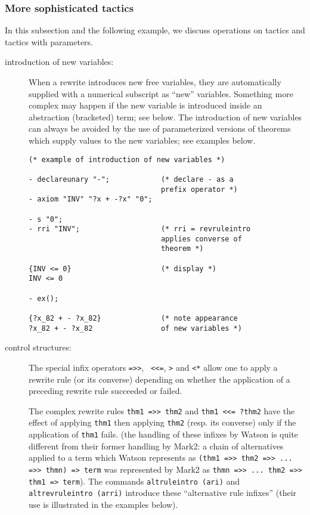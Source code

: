 \documentclass{kluwer}
\begin{document}
\begin{article}
\subsubsection{More sophisticated tactics}

In this subsection and the following example, we discuss operations
on tactics and tactics with parameters.

\begin{description}

\item[introduction of new variables:] When a rewrite introduces new
free variables, they are automatically supplied with a numerical
subscript as ``new'' variables.  Something more complex may happen if
the new variable is introduced inside an abstraction (bracketed) term;
see below.  The introduction of new variables can always be avoided by
the use of parameterized versions of theorems which supply values to
the new variables; see examples below.

\newpage

\begin{verbatim}
(* example of introduction of new variables *)

- declareunary "-";            (* declare - as a
                               prefix operator *)
- axiom "INV" "?x + -?x" "0";

- s "0";
- rri "INV";                   (* rri = revruleintro 
                               applies converse of 
                               theorem *)

{INV <= 0}                     (* display *)
INV <= 0

- ex();

{?x_82 + - ?x_82}              (* note appearance 
?x_82 + - ?x_82                of new variables *)
\end{verbatim}


\item[control structures:] The special infix operators {\tt =>>}, {\tt
<<=}, {\tt *>} and {\tt <*} allow one to apply a rewrite rule (or its
converse) depending on whether the application of a preceding rewrite
rule succeeded or failed.  

The complex rewrite rules {\tt thm1 =>> thm2} and {\tt thm1 <<= ?thm2}
have the effect of applying {\tt thm1} then applying {\tt thm2}
(resp. its converse) only if the application of {\tt thm1} fails.
(the handling of these infixes by Watson is quite different from their
former handling by Mark2: a chain of alternatives applied to a term
which Watson represents as {\tt (thm1 =>> thm2 =>> ... =>> thmn) =>
term} was represented by Mark2 as {\tt thmn =>> ... thm2 =>> thm1 =>
term}).  The commands {\tt altruleintro (ari)} and {\tt
altrevruleintro (arri)} introduce these ``alternative rule infixes''
(their use is illustrated in the examples below).


\end{description}
\end{article}
\end{document}

